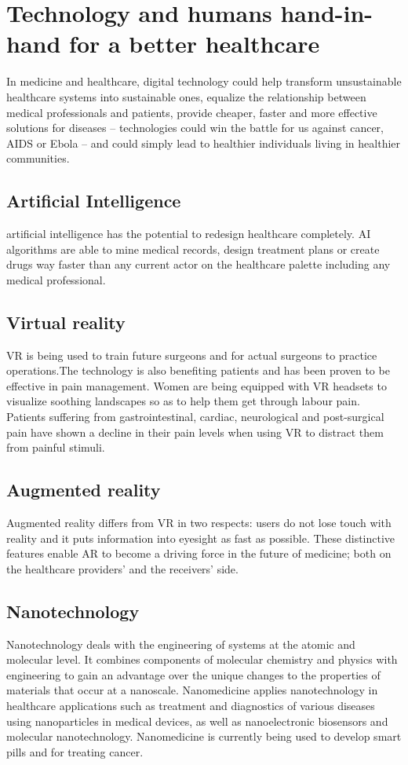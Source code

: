 \documentclass[12pt]{article}
\begin{document}
\section*{Technology and humans hand-in-hand for a better healthcare}
In medicine and healthcare, digital technology could help transform unsustainable healthcare systems into sustainable ones, equalize the relationship between medical professionals and patients, provide cheaper, faster and more effective solutions for diseases – technologies could win the battle for us against cancer, AIDS or Ebola – and could simply lead to healthier individuals living in healthier communities.

\subsection*{Artificial Intelligence}
artificial intelligence has the potential to redesign healthcare completely. AI algorithms are able to mine medical records, design treatment plans or create drugs way faster than any current actor on the healthcare palette including any medical professional. 


\subsection*{Virtual reality}
VR is being used to train future surgeons and for actual surgeons to practice operations.The technology is also benefiting patients and has been proven to be effective in pain management. Women are being equipped with VR headsets to visualize soothing landscapes so as to help them get through labour pain. Patients suffering from gastrointestinal, cardiac, neurological and post-surgical pain have shown a decline in their pain levels when using VR to distract them from painful stimuli. 


\subsection*{Augmented reality}
Augmented reality differs from VR in two respects: users do not lose touch with reality and it puts information into eyesight as fast as possible. These distinctive features enable AR to become a driving force in the future of medicine; both on the healthcare providers’ and the receivers’ side.

\subsection*{Nanotechnology}
Nanotechnology deals with the engineering of systems at the atomic and molecular level. It combines components of molecular chemistry and physics with engineering to gain an advantage over the unique changes to the properties of materials that occur at a nanoscale.
\linebreak
Nanomedicine applies nanotechnology in healthcare applications such as treatment and diagnostics of various diseases using nanoparticles in medical devices, as well as nanoelectronic biosensors and molecular nanotechnology. Nanomedicine is currently being used to develop smart pills and for treating cancer.
\end{document}

